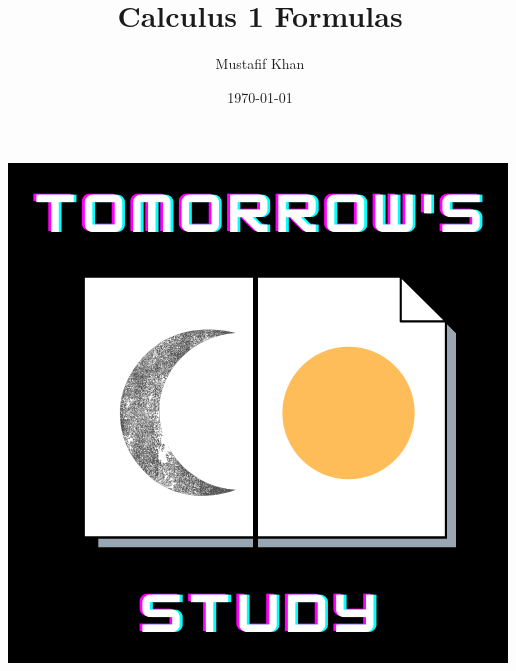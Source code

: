 \documentclass[12pt, letterpaper]{article}
\title{Calculus 1 Formulas}
\author{Mustafif Khan}
\date{\today}
\theoremstyle{break}
\begin{document}
\maketitle
\begin{center}
    \includegraphics[scale = 0.5]{TS.png}
\end{center}
\newpage
\tableofcontents
\newpage
\end{document}
